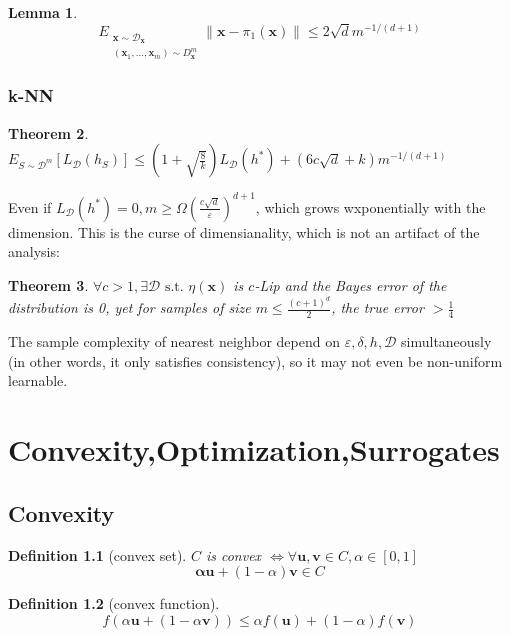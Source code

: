 \documentclass{book}
\newcommand{\st}{\text{ s.t. }}
\newcommand{\nm}[1]{\left\|#1\right\|}
\newcommand{\D}{\mathcal{D}}
\newtheorem{Thm}{Theorem}[section]
\newtheorem{Lemma}[Thm]{Lemma}
\newtheorem{Def}{Definition}[section]
\begin{document}
\begin{Lemma}
\begin{equation}
E_{\substack{\mathbf{x}\sim \D_{\mathbf{x}}\\ \left( \mathbf{x}_1,\dots,\mathbf{x}_m \right)\sim D^m_{\mathbf{x}}}}\nm{\mathbf{x}-\pi_1(\mathbf{x})}\leq 2 \sqrt{d}m^{-1/(d+1)}
\end{equation}
\end{Lemma}



\subsection{k-NN}
\begin{Thm}
  $E_{S\sim\D^m}\left[ L_{\D}(h_S) \right]\leq \left( 1+ \sqrt{\frac{8}{k}} \right)L_{\D}(h^{*})+\left( 6c \sqrt{d}+k \right)m^{-1/(d+1)}$
\end{Thm}
Even if $L_{\D}(h^{*})=0, m\geq \Omega \left( \frac{c \sqrt{d}}{\varepsilon} \right)^{d+1}$, which grows wxponentially with the dimension. This is the curse of dimensianality, which is not an artifact of the analysis:
\begin{Thm}
$\forall c>1,\exists \D\st \eta(\mathbf{x})$ is $c$-Lip and the Bayes error of the distribution is 0, yet for samples of size $m\leq \frac{(c+1)^d}{2}$, the true error $> \frac{1}{4}$
\end{Thm}

The sample complexity of nearest neighbor depend on $\varepsilon,\delta,h,\D$ simultaneously (in other words, it only satisfies consistency), so it may not even be non-uniform learnable.

\chapter{Convexity,Optimization,Surrogates}

\section{Convexity}
\begin{Def}[convex set]
  $C$ is convex $\Leftrightarrow\forall \mathbf{u},\mathbf{v}\in C,\alpha\in [0,1]$
\begin{equation}
\mathbf{\alpha}\mathbf{u}+(1-\alpha)\mathbf{v}\in C
\end{equation}
\end{Def}

\begin{Def}[convex function]
  \[f(\alpha\bm{u}+(1-\alpha\bm{v}))\leq \alpha f(\bm u)+(1-\alpha)f(\bm v)\]
\end{Def}
\end{document}

